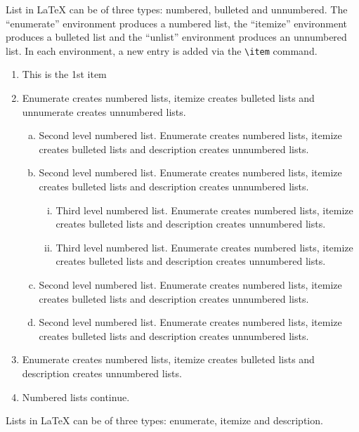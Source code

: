 \documentclass[unnumsec,webpdf,contemporary,large]{oup-authoring-template}%
\theoremstyle{thmstyleone}%
\theoremstyle{thmstyletwo}%
\theoremstyle{thmstylethree}%
\begin{document}
List in \LaTeX{} can be of three types: numbered, bulleted and unnumbered. The ``enumerate'' environment produces a numbered list, the 
``itemize'' environment produces a bulleted list and the ``unlist''
environment produces an unnumbered list.
In each environment, a new entry is added via the \verb+\item+ command.
\begin{enumerate}[1.]
\item This is the 1st item

\item Enumerate creates numbered lists, itemize creates bulleted lists and
unnumerate creates unnumbered lists.
\begin{enumerate}[(a)]
\item Second level numbered list. Enumerate creates numbered lists, itemize creates bulleted lists and
description creates unnumbered lists.

\item Second level numbered list. Enumerate creates numbered lists, itemize creates bulleted lists and
description creates unnumbered lists.
\begin{enumerate}[(ii)]
\item Third level numbered list. Enumerate creates numbered lists, itemize creates bulleted lists and
description creates unnumbered lists.

\item Third level numbered list. Enumerate creates numbered lists, itemize creates bulleted lists and
description creates unnumbered lists.
\end{enumerate}

\item Second level numbered list. Enumerate creates numbered lists, itemize creates bulleted lists and
description creates unnumbered lists.

\item Second level numbered list. Enumerate creates numbered lists, itemize creates bulleted lists and
description creates unnumbered lists.
\end{enumerate}

\item Enumerate creates numbered lists, itemize creates bulleted lists and
description creates unnumbered lists.

\item Numbered lists continue.
\end{enumerate}
Lists in \LaTeX{} can be of three types: enumerate, itemize and description.
\end{document}
